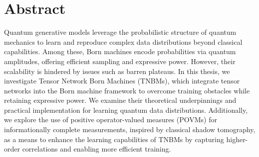 \chapter*{Abstract}
Quantum generative models leverage the probabilistic structure of quantum mechanics to learn and reproduce complex data distributions beyond classical capabilities. Among these, Born machines encode probabilities via quantum amplitudes, offering efficient sampling and expressive power. However, their scalability is hindered by issues such as barren plateaus. In this thesis, we investigate Tensor Network Born Machines (TNBMs), which integrate tensor networks into the Born machine framework to overcome training obstacles while retaining expressive power. We examine their theoretical underpinnings and practical implementation for learning quantum data distributions. Additionally, we explore the use of positive operator-valued measures (POVMs) for informationally complete measurements, inspired by classical shadow tomography, as a means to enhance the learning capabilities of TNBMs by capturing higher-order correlations and enabling more efficient training.

